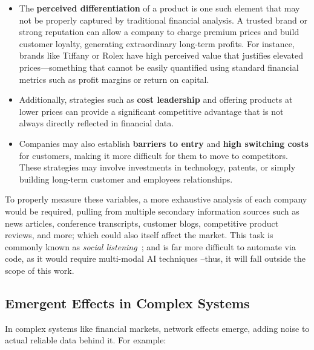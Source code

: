 \documentclass[11pt,english,a4paper,hidelinks]{book}
\begin{document}
\begin{itemize}
    \item The \textbf{perceived differentiation} of a product is one such element that may not be properly captured by traditional financial analysis. A trusted brand or strong reputation can allow a company to charge premium prices and build customer loyalty, generating extraordinary long-term profits. For instance, brands like Tiffany or Rolex have high perceived value that justifies elevated prices—something that cannot be easily quantified using standard financial metrics such as profit margins or return on capital.

    \item Additionally, strategies such as \textbf{cost leadership} and offering products at lower prices can provide a significant competitive advantage that is not always directly reflected in financial data.

    \item Companies may also establish \textbf{barriers to entry} and \textbf{high switching costs} for customers, making it more difficult for them to move to competitors. These strategies may involve investments in technology, patents, or simply building long-term customer and employees relationships.
\end{itemize}

\noindent To properly measure these variables, a more exhaustive analysis of each company would be required, pulling from multiple secondary information sources such as news articles, conference transcripts, customer blogs, competitive product reviews, and more; which could also itself affect the market. This task is commonly known as \textit{social listening}~\cite{WANG2022110598}; and is far more difficult to automate via code, as it would require multi-modal AI techniques --thus, it will fall outside the scope of this work.

\subsection{Emergent Effects in Complex Systems}

\noindent In complex systems like financial markets, network effects emerge, adding noise to actual reliable data behind it. For example:
\end{document}
